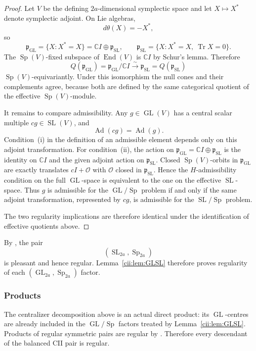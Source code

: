 \documentclass[11pt,reqno]{amsart}
\numberwithin{equation}{section}
\theoremstyle{definition}
\theoremstyle{remark}
\newcommand{\C}{\mathbb C}
\newcommand{\GL}{\operatorname{GL}}
\newcommand{\SL}{\operatorname{SL}}
\newcommand{\Sp}{\operatorname{Sp}}
\newcommand{\End}{\operatorname{End}}
\newcommand{\Ad}{\operatorname{Ad}}
\newcommand{\Tr}{\operatorname{Tr}}
\begin{document}
\begin{proof}
Let \(V\) be the defining \(2a\)-dimensional symplectic space and let
\(X\mapsto X^*\) denote symplectic adjoint.  On Lie algebras,
\[
  d\theta(X)=-X^*,
\]
so
\[
  \mathfrak p_{\GL}=\{X:X^*=X\}
  =\C I\oplus\mathfrak p_{\SL},
  \qquad
  \mathfrak p_{\SL}=\{X:X^*=X,\ \Tr X=0\}.
\]
The \(\Sp(V)\)-fixed subspace of \(\End(V)\) is \(\C I\) by Schur's
lemma.  Therefore
\[
  Q(\mathfrak p_{\GL})
  =\mathfrak p_{\GL}/\C I
  \xrightarrow{\sim}\mathfrak p_{\SL}
  =Q(\mathfrak p_{\SL})
\]
\(\Sp(V)\)-equivariantly.  Under this isomorphism the null cones and their
complements agree, because both are defined by the same categorical quotient
of the effective \(\Sp(V)\)-module.

It remains to compare admissibility.  Any \(g\in\GL(V)\) has a central
scalar multiple \(cg\in\SL(V)\), and
\[
  \Ad(cg)=\Ad(g).
\]
Condition~(i) in the definition of an admissible element
\cite[Definition~7.4.1]{AG09} depends only on this adjoint transformation.
For condition~(ii), the action on
\(\mathfrak p_{\GL}=\C I\oplus\mathfrak p_{\SL}\) is the identity on
\(\C I\) and the given adjoint action on \(\mathfrak p_{\SL}\).  Closed
\(\Sp(V)\)-orbits in \(\mathfrak p_{\GL}\) are exactly translates
\(cI+\mathcal O\) with \(\mathcal O\) closed in
\(\mathfrak p_{\SL}\).  Hence the \(H\)-admissibility condition on the
full \(\GL\)-space is equivalent to the one on the effective
\(\SL\)-space.  Thus \(g\) is admissible for the \(\GL/\Sp\) problem if
and only if the same adjoint transformation, represented by \(cg\), is
admissible for the \(\SL/\Sp\) problem.

The two regularity implications are therefore identical under the
identification of effective quotients above.
\end{proof}

By \cite[Proposition~4.14]{Rubio}, the pair
\[
  (\SL_{2a},\Sp_{2a})
\]
is pleasant and hence regular.  Lemma~\ref{cii:lem:GLSL} therefore proves
regularity of each \((\GL_{2a},\Sp_{2a})\) factor.

\subsubsection{Products}

The centralizer decomposition above is an actual direct product: its
\(\GL\)-centres are already included in the \(\GL/\Sp\) factors treated by
Lemma~\ref{cii:lem:GLSL}.  Products of regular symmetric pairs are regular by
\cite[Proposition~7.4.4]{AG09}.  Therefore every descendant of the balanced
CII pair is regular.
\end{document}
